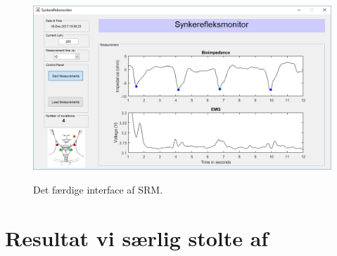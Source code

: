 \begin{figure}[H]
\centering
{\includegraphics[width=\linewidth]
{Figure/guiDone}}
\caption{Det færdige interface af SRM.}
\label{Fig:guiDone2}
\end{figure} 



\section{Resultat vi særlig stolte af}

